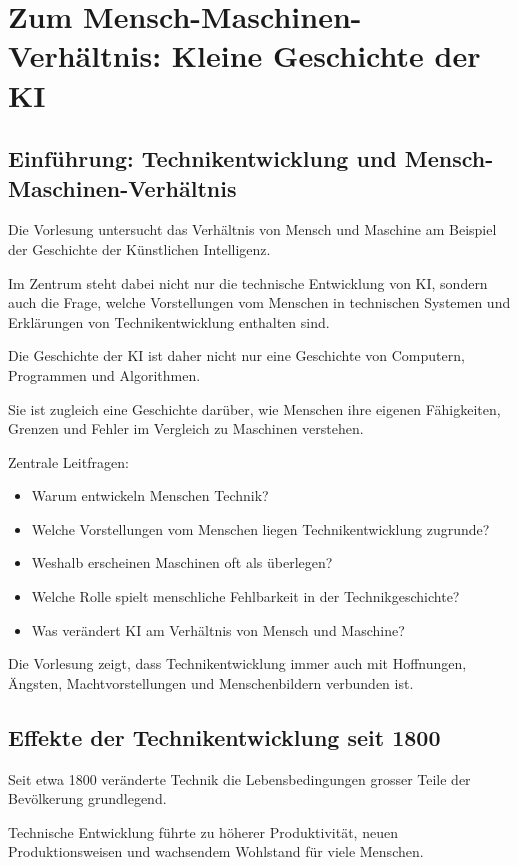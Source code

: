 \section{Zum Mensch-Maschinen-Verhältnis: Kleine Geschichte der KI}

\subsection{Einführung: Technikentwicklung und Mensch-Maschinen-Verhältnis}

Die Vorlesung untersucht das Verhältnis von Mensch und Maschine
am Beispiel der Geschichte der Künstlichen Intelligenz.

Im Zentrum steht dabei nicht nur die technische Entwicklung von KI,
sondern auch die Frage,
welche Vorstellungen vom Menschen
in technischen Systemen und Erklärungen von Technikentwicklung enthalten sind.

Die Geschichte der KI ist daher nicht nur eine Geschichte
von Computern,
Programmen und Algorithmen.

Sie ist zugleich eine Geschichte darüber,
wie Menschen ihre eigenen Fähigkeiten,
Grenzen und Fehler im Vergleich zu Maschinen verstehen.

Zentrale Leitfragen:

\begin{itemize}
\item Warum entwickeln Menschen Technik?
\item Welche Vorstellungen vom Menschen liegen Technikentwicklung zugrunde?
\item Weshalb erscheinen Maschinen oft als überlegen?
\item Welche Rolle spielt menschliche Fehlbarkeit in der Technikgeschichte?
\item Was verändert KI am Verhältnis von Mensch und Maschine?
\end{itemize}

Die Vorlesung zeigt,
dass Technikentwicklung immer auch mit Hoffnungen,
Ängsten,
Machtvorstellungen und Menschenbildern verbunden ist.

\subsection{Effekte der Technikentwicklung seit 1800}

Seit etwa 1800 veränderte Technik
die Lebensbedingungen grosser Teile der Bevölkerung grundlegend.

Technische Entwicklung führte zu höherer Produktivität,
neuen Produktionsweisen
und wachsendem Wohlstand für viele Menschen.

